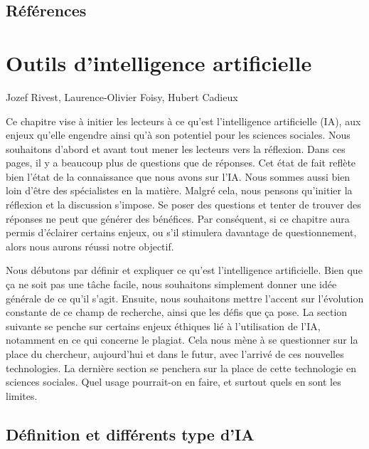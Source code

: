 \documentclass[
  letterpaper,
  DIV=11,
  numbers=noendperiod]{scrreprt}
\begin{document}
\section{Références}\label{ruxe9fuxe9rences}


\chapter{Outils d'intelligence
artificielle}\label{outils-dintelligence-artificielle}

\begin{center}

Jozef Rivest, Laurence-Olivier Foisy, Hubert Cadieux

\end{center}

Ce chapitre vise à initier les lecteurs à ce qu'est l'intelligence
artificielle (IA), aux enjeux qu'elle engendre ainsi qu'à son potentiel
pour les sciences sociales. Nous souhaitons d'abord et avant tout mener
les lecteurs vers la réflexion. Dans ces pages, il y a beaucoup plus de
questions que de réponses. Cet état de fait reflète bien l'état de la
connaissance que nous avons sur l'IA. Nous sommes aussi bien loin d'être
des spécialistes en la matière. Malgré cela, nous pensons qu'initier la
réflexion et la discussion s'impose. Se poser des questions et tenter de
trouver des réponses ne peut que générer des bénéfices. Par conséquent,
si ce chapitre aura permis d'éclairer certains enjeux, ou s'il stimulera
davantage de questionnement, alors nous aurons réussi notre objectif.

Nous débutons par définir et expliquer ce qu'est l'intelligence
artificielle. Bien que ça ne soit pas une tâche facile, nous souhaitons
simplement donner une idée générale de ce qu'il s'agit. Ensuite, nous
souhaitons mettre l'accent sur l'évolution constante de ce champ de
recherche, ainsi que les défis que ça pose. La section suivante se
penche sur certains enjeux éthiques lié à l'utilisation de l'IA,
notamment en ce qui concerne le plagiat. Cela nous mène à se questionner
sur la place du chercheur, aujourd'hui et dans le futur, avec l'arrivé
de ces nouvelles technologies. La dernière section se penchera sur la
place de cette technologie en sciences sociales. Quel usage pourrait-on
en faire, et surtout quels en sont les limites.

\section{Définition et différents type
d'IA}\label{duxe9finition-et-diffuxe9rents-type-dia}
\end{document}
